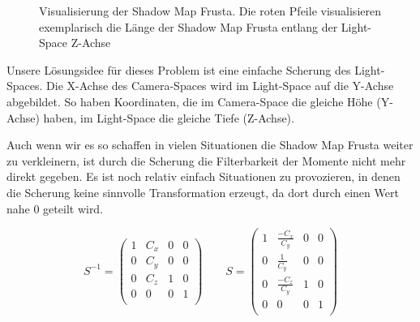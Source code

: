 \documentclass[runningheaders,a4paper]{llncs}
\begin{document}
\begin{figure}[H]
	\centering
	
	\caption{Visualisierung der Shadow Map Frusta. Die roten Pfeile visualisieren exemplarisch die Länge der Shadow Map Frusta entlang der Light-Space Z-Achse}
\end{figure}

Unsere Lösungsidee für dieses Problem ist eine einfache Scherung des Light-Spaces.
Die X-Achse des Camera-Spaces wird im Light-Space auf die Y-Achse abgebildet.
So haben Koordinaten, die im Camera-Space die gleiche Höhe (Y-Achse) haben, im Light-Space die gleiche Tiefe (Z-Achse).

Auch wenn wir es so schaffen in vielen Situationen die Shadow Map Frusta weiter zu verkleinern, ist durch die Scherung die Filterbarkeit der Momente \cite{msm} nicht mehr direkt gegeben.
Es ist noch relativ einfach Situationen zu provozieren, in denen die Scherung keine sinnvolle Transformation erzeugt, da dort durch einen Wert nahe $0$ geteilt wird.

\begin{equation}
	S^{-1} = \left(\begin{array}{cccc}
		1 & C_x & 0 & 0 \\
		0 & C_y & 0 & 0 \\
		0 & C_z & 1 & 0 \\
		0 & 0 & 0 & 1 \\
	\end{array}\right)
	\qquad
	S = \left(\begin{array}{cccc}
	1 & \frac{-C_x}{C_y} & 0 & 0 \\
	0 & \frac{1}{C_y} & 0 & 0 \\
	0 & \frac{-C_z}{C_y} & 1 & 0 \\
	0 & 0 & 0 & 1 \\
	\end{array}\right)
\end{equation}
\end{document}
